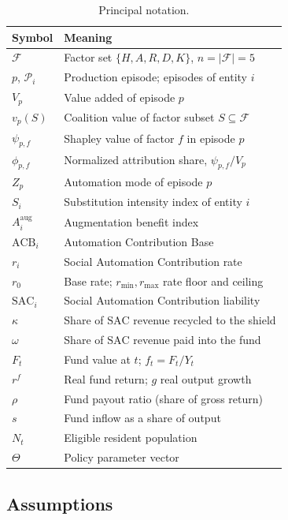 \documentclass[journal]{IEEEtran}
\theoremstyle{plain}
\theoremstyle{definition}
\newcommand{\ACB}{\mathrm{ACB}}
\newcommand{\SAC}{\mathrm{SAC}}
\begin{document}
\begin{table}[!t]
\centering
\caption{Principal notation.}
\label{tab:notation}
\footnotesize
\begin{tabular}{@{}l l@{}}
\toprule
\textbf{Symbol} & \textbf{Meaning} \\
\midrule
$\mathcal{F}$ & Factor set $\{H,A,R,D,K\}$, $n=|\mathcal{F}|=5$ \\
$p$, $\mathcal{P}_i$ & Production episode; episodes of entity $i$ \\
$V_p$ & Value added of episode $p$ \\
$v_p(S)$ & Coalition value of factor subset $S\subseteq\mathcal{F}$ \\
$\psi_{p,f}$ & Shapley value of factor $f$ in episode $p$ \\
$\phi_{p,f}$ & Normalized attribution share, $\psi_{p,f}/V_p$ \\
$Z_p$ & Automation mode of episode $p$ \\
$S_i$ & Substitution intensity index of entity $i$ \\
$A^{\mathrm{aug}}_i$ & Augmentation benefit index \\
$\ACB_i$ & Automation Contribution Base \\
$r_i$ & Social Automation Contribution rate \\
$r_0$ & Base rate; $r_{\min},r_{\max}$ rate floor and ceiling \\
$\SAC_i$ & Social Automation Contribution liability \\
$\kappa$ & Share of $\SAC$ revenue recycled to the shield \\
$\omega$ & Share of $\SAC$ revenue paid into the fund \\
$F_t$ & Fund value at $t$; $f_t=F_t/Y_t$ \\
$r^{f}$ & Real fund return; $g$ real output growth \\
$\rho$ & Fund payout ratio (share of gross return) \\
$s$ & Fund inflow as a share of output \\
$N_t$ & Eligible resident population \\
$\Theta$ & Policy parameter vector \\
\bottomrule
\end{tabular}
\end{table}

\subsection{Assumptions}
\end{document}

